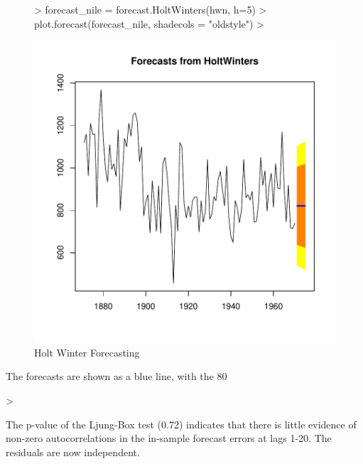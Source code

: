 \documentclass[10pt, a4paper]{article} %
\begin{document}
\begin{figure}[H]
\centering
\begin{Schunk}
\begin{Sinput}
> forecast_nile = forecast.HoltWinters(hwn, h=5)
> plot.forecast(forecast_nile, shadecols = "oldstyle")
> 
\end{Sinput}
\end{Schunk}
\includegraphics{FINAL_VERSION-094}
\caption{Holt Winter Forecasting}
\end{figure}

\noindent The forecasts are shown as a blue line, with the 80%


\begin{Schunk}
\begin{Sinput}
> 
\end{Sinput}
\end{Schunk}
\noindent The p-value of the Ljung-Box test (0.72) indicates that there is little evidence of non-zero autocorrelations in the in-sample forecast errors at lags 1-20. The residuals are now independent.\\
\end{document}

